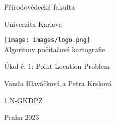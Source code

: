 \documentclass[15pt]{article}
\begin{document}
 

\begin{titlepage}
        \centering
        {\large Přírodovědecká fakulta
        
        Univerzita Karlova\par}
        \vspace{1cm}
        \texttt{[image: images/logo.png]}\\
        \vspace{2cm}
        {\large Algoritmy počítačové kartografie}\\
        {\huge Úkol č. 1: Point Location Problem \par}
        \vspace{0.5cm}
        {\large Vanda Hlaváčková a Petra Krsková \par}
        \vspace{2cm}
        1.N-GKDPZ
    
        Praha 2023
        \vspace{3cm}
\end{titlepage}
\end{document}
